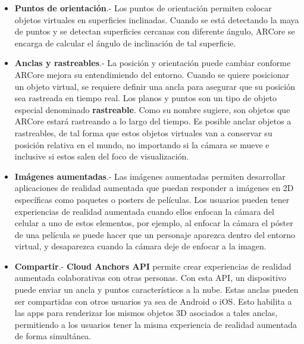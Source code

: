 \begin{itemize}
	\item \textbf{Puntos de orientación}.- Los puntos de orientación permiten colocar objetos virtuales en superficies inclinadas. Cuando se está detectando la maya de puntos y se detectan superficies cercanas con diferente ángulo, ARCore se encarga de calcular el ángulo de inclinación de tal superficie.
	
	\item \textbf{Anclas y rastreables}.- La posición y orientación puede cambiar conforme ARCore mejora su entendimiendo del entorno. Cuando se quiere posicionar un objeto virtual, se requiere definir una ancla para asegurar que su posición sea rastreada en tiempo real. Los planos y puntos son un tipo de objeto especial denominado \textbf{rastreable}. Como su nombre sugiere, son objetos que ARCore estará rastreando a lo largo del tiempo. Es posible anclar objetos a rastreables, de tal forma que estos objetos virtuales van a conservar su posición relativa en el mundo, no importando si la cámara se mueve e inclusive si estos salen del foco de visualización.
	
	\item \textbf{Imágenes aumentadas}.- Las imágenes aumentadas permiten desarrollar aplicaciones de realidad aumentada que puedan responder a imágenes en 2D específicas como paquetes o posters de películas. Los usuarios pueden tener experiencias de realidad aumentada cuando ellos enfocan la cámara del celular a uno de estos elementos, por ejemplo, al enfocar la cámara el póster de una película se puede hacer que un personaje aparezca dentro del entorno virtual, y desaparezca cuando la cámara deje de enfocar a la imagen.
	
	\item \textbf{Compartir}.- \textbf{Cloud Anchors API} permite crear experiencias de realidad aumentada colaborativas con otras personas. Con esta API, un dispositivo puede enviar un ancla y puntos característicos a la nube. Estas anclas pueden ser compartidas con otros usuarios ya sea de Android o iOS. Esto habilita a las apps para renderizar los mismos objetos 3D asociados a tales anclas, permitiendo a los usuarios tener la misma experiencia de realidad aumentada de forma simultánea.
	
\end{itemize}

